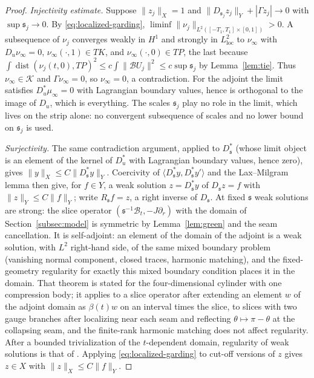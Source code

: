 \documentclass[11pt]{amsart}
\theoremstyle{definition}
\theoremstyle{remark}
\theoremstyle{plain}
\numberwithin{equation}{section}
\newcommand{\dist}{\operatorname{dist}}
\begin{document}
\begin{proof}
\emph{Injectivity estimate.} Suppose $\|z_j\|_X=1$ and
$\|D_{{\mathfrak s}_j}z_j\|_Y+|\Gamma z_j|\to0$ with $\sup{\mathfrak s}_j\to0$. By
\eqref{eq:localized-garding}, $\liminf\|\nu_j\|_{L^2([-T_1,T_1]\times
[0,1])}>0$. A subsequence of $\nu_j$ converges weakly in $H^1$ and
strongly in $L^2_{\mathrm{loc}}$ to $\nu_\infty$ with $D_u\nu_\infty=0$,
$\nu_\infty(\cdot,1)\in TK$, and $\nu_\infty(\cdot,0)\in TP$, the last
because $\int\dist(\nu_j(t,0),TP)^2\le c\int\|\mathcal BU_j\|^2\le
c\sup{\mathfrak s}_j$ by Lemma~\ref{lem:tie}. Thus $\nu_\infty\in\mathcal K$ and
$\Gamma\nu_\infty=0$, so $\nu_\infty=0$, a contradiction. For the adjoint
the limit satisfies $D_u^*\mu_\infty=0$ with Lagrangian boundary values,
hence is orthogonal to the image of $D_u$, which is everything. The
scales ${\mathfrak s}_j$ play no role in the limit, which lives on the strip
alone: no convergent subsequence of scales and no lower bound on
${\mathfrak s}_j$ is used.

\emph{Surjectivity.} The same contradiction argument, applied to $D_{\mathfrak s}^*$
(whose limit object is an element of the kernel of $D_u^*$ with Lagrangian
boundary values, hence zero), gives $\|y\|_X\le C\|D^*_{\mathfrak s} y\|_Y$. Coercivity of
$\langle D^*_{\mathfrak s} y,D^*_{\mathfrak s} y'\rangle$ and the Lax--Milgram lemma then give, for $f\in Y$, a weak solution
$z=D^*_{\mathfrak s} y$ of $D_{\mathfrak s} z=f$ with $\|z\|_Y\le C\|f\|_Y$; write $R_{\mathfrak s}f=z$, a right
inverse of $D_{\mathfrak s}$. At fixed
${\mathfrak s}$ weak solutions are strong: the slice operator
$({\mathfrak s}^{-1}\mathcal B_t,-J\partial_r)$ with the domain of
Section~\ref{subsec:model} is symmetric by Lemma~\ref{lem:green} and the seam
cancellation. It is self-adjoint: an element of the domain of the adjoint is
a weak solution, with $L^2$ right-hand side, of the same mixed boundary
problem (vanishing normal component, closed traces, harmonic matching), and
the fixed-geometry regularity for exactly this mixed boundary condition
\cite[Theorem~4.17 and Remark~4.19]{DFL} places it in the domain. That theorem
is stated for the four-dimensional cylinder with one compression body; it
applies to a slice operator after extending an element $w$ of the adjoint domain
as $\beta(t)w$ on an interval times the slice, to slices with two gauge branches
after localizing near each seam and reflecting $\theta\mapsto\pi-\theta$ at the
collapsing seam, and the finite-rank harmonic matching does not affect
regularity. After a bounded trivialization of the $t$-dependent domain, regularity of weak
solutions is that of \cite{Robbin-Salamon}. Applying
\eqref{eq:localized-garding} to cut-off versions of $z$ gives $z\in X$
with $\|z\|_X\le C\|f\|_Y$.


\end{proof}
\end{document}

